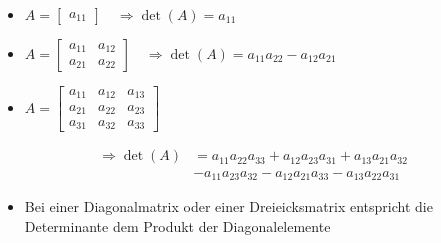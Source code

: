 \begin{minipage}[c]{0.38\columnwidth}
    \begin{itemize}
        \item $A = \begin{bmatrix} 
                        a_{11} 
                    \end{bmatrix} 
                    \quad \Rightarrow \det(A) = a_{11}$
    \end{itemize}
\end{minipage}
\hfill
\begin{minipage}[c]{0.6\columnwidth}
    \begin{itemize}
        \item $A = \begin{bmatrix}
                        a_{11}  & a_{12}    \\
                        a_{21}  & a_{22}
                    \end{bmatrix}
                    \quad \Rightarrow \det(A) = a_{11} a_{22} - a_{12} a_{21}$ 
    \end{itemize}
\end{minipage}


\begin{minipage}[c]{0.38\columnwidth}
    \begin{itemize}
        \item $A = \begin{bmatrix}
                        a_{11}  & a_{12}    & a_{13}    \\
                        a_{21}  & a_{22}    & a_{23}    \\
                        a_{31}  & a_{32}    & a_{33}    
                    \end{bmatrix}$
    \end{itemize}
\end{minipage}
\hfill
\begin{minipage}[c]{0.6\columnwidth}
    \begin{align*}
        \Rightarrow \det(A) &= a_{11} a_{22} a_{33} + a_{12} a_{23} a_{31} + a_{13} a_{21} a_{32}\\
                            &- a_{11} a_{23} a_{32} - a_{12} a_{21} a_{33} - a_{13} a_{22} a_{31}
    \end{align*}
\end{minipage}

\smallskip

\begin{itemize}
    \item Bei einer Diagonalmatrix oder einer Dreieicksmatrix entspricht die Determinante dem Produkt der Diagonalelemente
\end{itemize}


